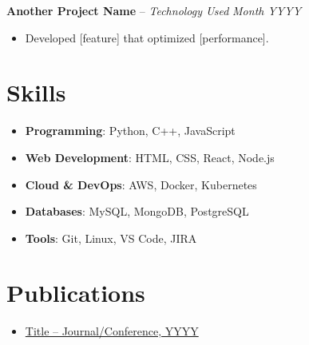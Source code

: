 \documentclass[a4paper,9pt]{article}
\begin{document}
\textbf{Another Project Name} – \textit{Technology Used} \hfill \textit{Month YYYY}\\
\begin{itemize}
    \item Developed [feature] that optimized [performance].
\end{itemize}

\section*{Skills}
\begin{multicols}{2}
\begin{itemize}
    \item \textbf{Programming}: Python, C++, JavaScript
    \item \textbf{Web Development}: HTML, CSS, React, Node.js
    \item \textbf{Cloud \& DevOps}: AWS, Docker, Kubernetes
    \item \textbf{Databases}: MySQL, MongoDB, PostgreSQL
    \item \textbf{Tools}: Git, Linux, VS Code, JIRA
\end{itemize}
\end{multicols}

\section*{Publications}
\begin{itemize}
    \item \href{#}{Title – Journal/Conference, YYYY}
\end{itemize}
\end{document}
